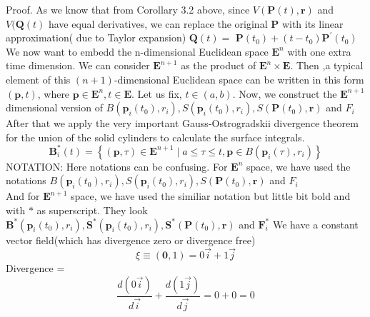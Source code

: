 Proof. As we know that from Corollary 3.2 above, since $V(\mathbf{P}(t), \mathbf{r})$ and $V(\mathbf{Q}(t)$ have equal derivatives, we can replace the original $\mathbf{P}$ with its linear approximation( due to Taylor expansion) $\mathbf{Q}(t)=$ $\mathbf{P}\left(t_{0}\right)+\left(t-t_{0}\right) \mathbf{P}^{\prime}\left(t_{0}\right)$\\
We now want to embedd the n-dimensional Euclidean space  $\mathbf{E}^{n}$ with one extra time dimension. We can consider  $\mathbf{E}^{n+1}$ as the product of $\mathbf{E}^{n} \times \mathbf{E}$. Then ,a typical element of  this $(n+1)$-dimensional Euclidean space  can be written in this  form $(\mathbf{p}, t)$, where $\mathbf{p} \in \mathbf{E}^{n}, t \in \mathbf{E}$. Let us fix,  $t \in(a, b)$. Now, 
we  construct the  $\mathbf{E}^{n+1}$ dimensional version of $B\left(\mathbf{p}_{i}\left(t_{0}\right), r_{i}\right),S\left(\mathbf{p}_{i}\left(t_{0}\right), r_{i}\right) , S\left(\mathbf{P}\left(t_{0}\right), \mathbf{r}\right)$ and $F_{i}$\\
After that we  apply the very important Gauss-Ostrogradskii  divergence theorem for the union of the solid cylinders to calculate the surface integrals.
$$
\mathbf{B}_{i}^*(t)=\left\{(\mathbf{p}, \tau) \in \mathbf{E}^{n+1} \mid a \leq \tau \leq t, \mathbf{p} \in B\left(\mathbf{p}_{i}(\tau), r_{i}\right)\right\}
$$
NOTATION: Here notations can be confusing. For  $\mathbf{E}^{n}$ space, we have used the notations $B\left(\mathbf{p}_{i}\left(t_{0}\right), r_{i}\right),S\left(\mathbf{p}_{i}\left(t_{0}\right), r_{i}\right) , S\left(\mathbf{P}\left(t_{0}\right), \mathbf{r}\right)$ and $F_{i}$\\
And for  $\mathbf{E}^{n+1}$ space, we have used the similiar notation but little bit bold and with $*$ as superscript. They look   $\mathbf{B}^*\left(\mathbf{p}_{i}\left(t_{0}\right), r_{i}\right),\mathbf{S}^*\left(\mathbf{p}_{i}\left(t_{0}\right), r_{i}\right) , \mathbf{S}^*\left(\mathbf{P}\left(t_{0}\right), \mathbf{r}\right)$ and $\mathbf{F}_{i}^{*}$
We have a constant vector field(which has divergence zero or divergence free)
$$
\xi \equiv(\mathbf{0}, 1) = 0 \vec{i} + 1 \vec{j} 
$$
Divergence = $$\frac{d(0 \vec{i})}{d \Vec{i}} + \frac{d(1 \vec{j})}{d \Vec{j}}=0+0=0 $$\\








